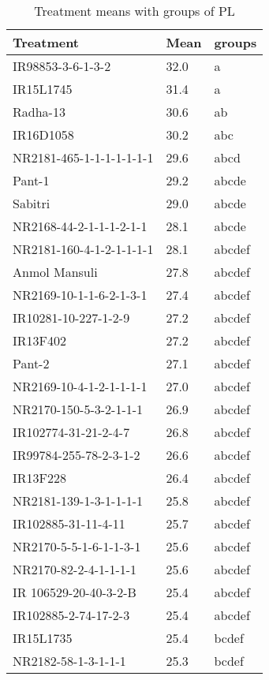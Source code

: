 \documentclass[]{article}
\begin{document}
\begin{longtable}{lll}
\caption{\label{tab:two-fac-groups-tab1}Treatment means with groups of PL}\\
\toprule
Treatment & Mean & groups\\
\midrule
\rowcolor{gray!6}  IR98853-3-6-1-3-2 & 32.0 & a\\
IR15L1745 & 31.4 & a\\
\rowcolor{gray!6}  Radha-13 & 30.6 & ab\\
IR16D1058 & 30.2 & abc\\
\rowcolor{gray!6}  NR2181-465-1-1-1-1-1-1-1 & 29.6 & abcd\\
\addlinespace
Pant-1 & 29.2 & abcde\\
\rowcolor{gray!6}  Sabitri & 29.0 & abcde\\
NR2168-44-2-1-1-1-2-1-1 & 28.1 & abcde\\
\rowcolor{gray!6}  NR2181-160-4-1-2-1-1-1-1 & 28.1 & abcdef\\
Anmol Mansuli & 27.8 & abcdef\\
\addlinespace
\rowcolor{gray!6}  NR2169-10-1-1-6-2-1-3-1 & 27.4 & abcdef\\
IR10281-10-227-1-2-9 & 27.2 & abcdef\\
\rowcolor{gray!6}  IR13F402 & 27.2 & abcdef\\
Pant-2 & 27.1 & abcdef\\
\rowcolor{gray!6}  NR2169-10-4-1-2-1-1-1-1 & 27.0 & abcdef\\
\addlinespace
NR2170-150-5-3-2-1-1-1 & 26.9 & abcdef\\
\rowcolor{gray!6}  IR102774-31-21-2-4-7 & 26.8 & abcdef\\
IR99784-255-78-2-3-1-2 & 26.6 & abcdef\\
\rowcolor{gray!6}  IR13F228 & 26.4 & abcdef\\
NR2181-139-1-3-1-1-1-1 & 25.8 & abcdef\\
\addlinespace
\rowcolor{gray!6}  IR102885-31-11-4-11 & 25.7 & abcdef\\
NR2170-5-5-1-6-1-1-3-1 & 25.6 & abcdef\\
\rowcolor{gray!6}  NR2170-82-2-4-1-1-1-1 & 25.6 & abcdef\\
IR 106529-20-40-3-2-B & 25.4 & abcdef\\
\rowcolor{gray!6}  IR102885-2-74-17-2-3 & 25.4 & abcdef\\
\addlinespace
IR15L1735 & 25.4 & bcdef\\
\rowcolor{gray!6}  NR2182-58-1-3-1-1-1 & 25.3 & bcdef\\

\end{longtable}
\end{document}
